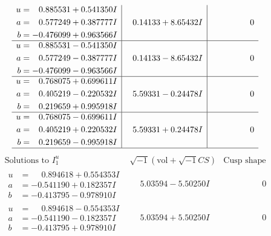 \documentclass[1p]{elsarticle_modified}
\theoremstyle{definition}
\newcommand{\I}{\sqrt{-1}}
\begin{document}
$$\begin{array}{c|c|c}
\begin{aligned}
u &= \phantom{-}0.885531 + 0.541350 I \\
a &= \phantom{-}0.577249 + 0.387777 I \\
b &= -0.476099 + 0.963566 I\end{aligned}
 & \phantom{-}0.14133 + 8.65432 I & \phantom{-0.000000 } 0 \\ \hline\begin{aligned}
u &= \phantom{-}0.885531 - 0.541350 I \\
a &= \phantom{-}0.577249 - 0.387777 I \\
b &= -0.476099 - 0.963566 I\end{aligned}
 & \phantom{-}0.14133 - 8.65432 I & \phantom{-0.000000 } 0 \\ \hline\begin{aligned}
u &= \phantom{-}0.768075 + 0.699611 I \\
a &= \phantom{-}0.405219 - 0.220532 I \\
b &= \phantom{-}0.219659 + 0.995918 I\end{aligned}
 & \phantom{-}5.59331 - 0.24478 I & \phantom{-0.000000 } 0 \\ \hline\begin{aligned}
u &= \phantom{-}0.768075 - 0.699611 I \\
a &= \phantom{-}0.405219 + 0.220532 I \\
b &= \phantom{-}0.219659 - 0.995918 I\end{aligned}
 & \phantom{-}5.59331 + 0.24478 I & \phantom{-0.000000 } 0\\
 \hline 
 \end{array}$$\newpage$$\begin{array}{c|c|c}  
\text{Solutions to }I^u_{1}& \I (\text{vol} + \sqrt{-1}CS) & \text{Cusp shape}\\
 \hline 
\begin{aligned}
u &= \phantom{-}0.894618 + 0.554353 I \\
a &= -0.541190 + 0.182357 I \\
b &= -0.413795 - 0.978910 I\end{aligned}
 & \phantom{-}5.03594 - 5.50250 I & \phantom{-0.000000 } 0 \\ \hline\begin{aligned}
u &= \phantom{-}0.894618 - 0.554353 I \\
a &= -0.541190 - 0.182357 I \\
b &= -0.413795 + 0.978910 I\end{aligned}
 & \phantom{-}5.03594 + 5.50250 I & \phantom{-0.000000 } 0 \\ \hline\begin{aligned}

\end{aligned}
\end{array}$$
\end{document}
